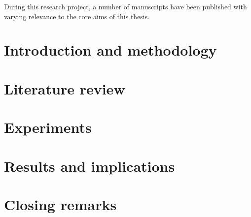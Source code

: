 \documentclass[english]{his-thesis}
\begin{document}

\maketitle

\cleardoublepage
{}%
\setcounter{page}{1}%
\pagestyle{headings}


%
%

\begin{ownpublications}
    During this research project, a number of manuscripts have been published with varying relevance to the core aims of this thesis.
\end{ownpublications}

%

\tableofcontents
\listoffigures
\listoftables

\cleardoublepage
{}%
\setcounter{page}{1}%
\pagestyle{headings}

\part{Introduction and methodology}


\part{Literature review}

\part{Experiments}


\part{Results and implications}




\part{Closing remarks}


%


\listofreferences

\end{document}
